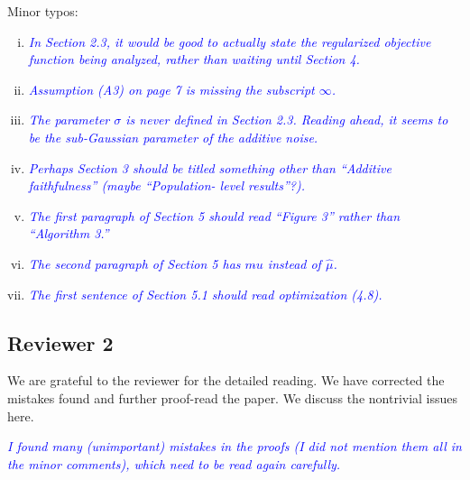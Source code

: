 \documentclass[pdftex,12pt]{article}
\let\hat\widehat
\def\rc#1{{\it\textcolor{blue}{#1}}\smallskip}
\begin{document}
\begin{enumerate}[(1)]
Minor typos:
\begin{enumerate}[(i)]
\item \rc{In Section 2.3, it would be good to actually state the regularized
objective function being analyzed, rather than waiting until Section
4.}
\item \rc{Assumption (A3) on page 7 is missing the subscript $\infty$.}
\item \rc{The parameter $\sigma$ is never defined in Section 2.3. Reading ahead,
it seems to be the sub-Gaussian parameter of the additive noise.}
\item \rc{Perhaps Section 3 should be titled something other than ``Additive
faithfulness'' (maybe ``Population- level results''?).}
\item \rc{The first paragraph of Section 5 should read
  ``Figure 3'' rather than ``Algorithm 3.''}

\item \rc{The second paragraph of Section 5 has $m\hat{}u$ instead of $\hat\mu$.}
\item \rc{The first sentence of Section 5.1 should read optimization (4.8).}
\end{enumerate}

\end{enumerate}

\subsection*{Reviewer 2}


We are grateful to the reviewer for the detailed reading. We have corrected the mistakes found and further proof-read the paper. We discuss the nontrivial issues here.  

\rc{I found many (unimportant) mistakes in the proofs (I
  did not mention them all in the minor comments), which need to be
  read again carefully.}
\end{document}
